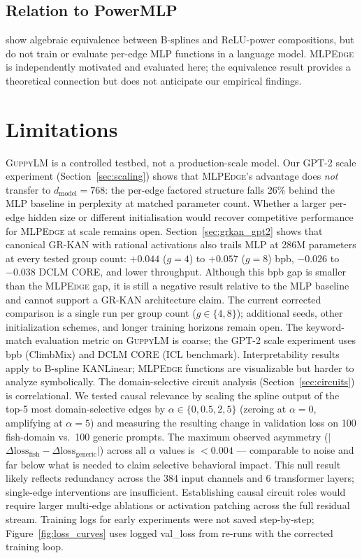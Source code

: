 \documentclass{article}
\newcommand{\mlpedge}{\textsc{MLPEdge}}
\newcommand{\guppylm}{\textsc{GuppyLM}}
\newcommand{\grkan}{\textsc{GR-KAN}}
\begin{document}
\subsection{Relation to PowerMLP}

\citet{tang2025powermlp} show algebraic equivalence between B-splines and
ReLU-power compositions, but do not train or evaluate per-edge MLP functions
in a language model.
\mlpedge{} is independently motivated and evaluated here;
the equivalence result provides a theoretical connection but does not
anticipate our empirical findings.

\section{Limitations}
\label{sec:limitations}

\guppylm{} is a controlled testbed, not a production-scale model.
Our GPT-2 scale experiment (Section~\ref{sec:scaling}) shows that
\mlpedge{}'s advantage does \emph{not} transfer to $d_\text{model}=768$:
the per-edge factored structure falls 26\% behind the MLP baseline in
perplexity at matched parameter count.
Whether a larger per-edge hidden size or different initialisation would
recover competitive performance for \mlpedge{} at scale remains open.
Section~\ref{sec:grkan_gpt2} shows that canonical \grkan{} with rational
activations also trails MLP at 286M parameters at every tested group count:
$+0.044$ ($g=4$) to $+0.057$ ($g=8$) bpb, $-0.026$ to $-0.038$ DCLM CORE,
and lower throughput.
Although this bpb gap is smaller than the \mlpedge{} gap, it is still a negative
result relative to the MLP baseline and cannot support a \grkan{} architecture
claim.
The current corrected comparison is a single run per group count ($g \in \{4,8\}$); additional seeds, other
initialization schemes, and longer training horizons remain open.
The keyword-match evaluation metric on \guppylm{} is coarse; the GPT-2
scale experiment uses bpb (ClimbMix) and DCLM CORE (ICL benchmark).
Interpretability results apply to B-spline KANLinear; \mlpedge{} functions
are visualizable but harder to analyze symbolically.
The domain-selective circuit analysis (Section~\ref{sec:circuits}) is
correlational.
We tested causal relevance by scaling the spline output of the top-5 most
domain-selective edges by $\alpha \in \{0, 0.5, 2, 5\}$ (zeroing at
$\alpha=0$, amplifying at $\alpha=5$) and measuring the resulting change in
validation loss on 100 fish-domain vs.\ 100 generic prompts.
The maximum observed asymmetry (|$\Delta\text{loss}_\text{fish}
- \Delta\text{loss}_\text{generic}|$) across all $\alpha$ values is
$\mathbf{<0.004}$ --- comparable to noise and far below what is needed to
claim selective behavioral impact.
This null result likely reflects redundancy across the 384 input channels and
6 transformer layers; single-edge interventions are insufficient.
Establishing causal circuit roles would require larger multi-edge ablations or
activation patching across the full residual stream.
Training logs for early experiments were not saved step-by-step;
Figure~\ref{fig:loss_curves} uses logged val\_loss from re-runs with the
corrected training loop.
\end{document}

